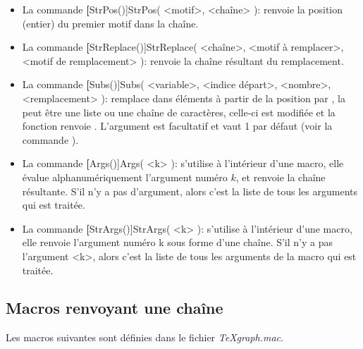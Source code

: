 \begin{itemize}
\item La commande \textbf[StrPos()]{StrPos( <motif>, <chaîne> )}: renvoie la position (entier) du premier motif dans la chaîne.

\item La commande \textbf[StrReplace()]{StrReplace( <chaîne>, <motif à remplacer>, <motif de remplacement> )}: renvoie la chaîne résultant du remplacement.

\item La commande \textbf[Subs()]{Subs( <variable>, <indice départ>, <nombre>, <remplacement> )}: remplace dans   éléments à partir de la position  par , la  peut être une liste ou une chaîne de caractères, celle-ci est modifiée et la fonction renvoie \Nil. L'argument  est facultatif et vaut 1 par défaut (voir la commande ).

\item La commande \textbf[Args()]{Args( <k> )}: s'utilise à l'intérieur d'une macro, elle évalue alphanumériquement l'argument numéro $k$, et renvoie la chaîne résultante. S'il n'y a pas d'argument, alors c'est la liste de tous les arguments qui est traitée.

\item La commande \textbf[StrArgs()]{StrArgs( <k> )}: s'utilise à l'intérieur d'une macro, elle renvoie l'argument numéro k sous forme d'une chaîne. S'il n'y a pas l'argument <k>, alors c'est la liste de tous les arguments de la macro qui est traitée.

\end{itemize}


\subsection{Macros renvoyant une chaîne}

Les macros suivantes sont définies dans le fichier \textit{TeXgraph.mac}.

